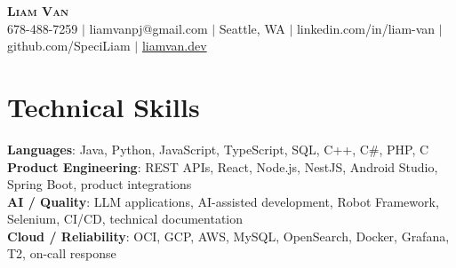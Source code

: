 \documentclass[letterpaper,11pt]{article}
\begin{document}

%
\begin{center}
    \textbf{\Huge \scshape Liam Van} \\ \vspace{1pt}
    \small 678-488-7259 $|$ \small {liamvanpj@gmail.com} $|$ Seattle, WA
 {{$|$ linkedin.com/in/liam-van} {$|$ github.com/SpeciLiam} {$|$ \href{https://liamvan.dev}{liamvan.dev}}}

\end{center}

\section{Technical Skills}
 \begin{itemize}[leftmargin=0.15in, label={}]
    \small{\item{
     \textbf{Languages}{: Java, Python, JavaScript, TypeScript, SQL, C++, C\#, PHP, C} \\
     \textbf{Product Engineering}{: REST APIs, React, Node.js, NestJS, Android Studio, Spring Boot, product integrations} \\
     \textbf{AI / Quality}{: LLM applications, AI-assisted development, Robot Framework, Selenium, CI/CD, technical documentation} \\
     \textbf{Cloud / Reliability}{: OCI, GCP, AWS, MySQL, OpenSearch, Docker, Grafana, T2, on-call response} \\
    }}
 \end{itemize}
%

\end{document}
